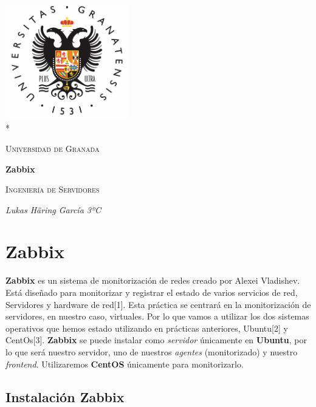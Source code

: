 \documentclass[12pt,a4paper]{article}
\date{\specialdate\today}
\begin{document}
	\begin{titlepage}
		\centering
		\includegraphics[width=0.4\textwidth]{logo-ugr.png}\\*
		{\scshape\LARGE Universidad de Granada \par}
		{\large \date{\specialdate\today}\par}
		\vspace{1cm}
		{\LARGE\bfseries Zabbix\par}
		\vspace{1.5cm}
		{\scshape\large Ingeniería de Servidores\par}
		\vspace{2cm}
		{\Large\itshape Lukas Häring García 3ºC\par}
	\end{titlepage}
	
	\tableofcontents
	
	\newpage
	
	\section{Zabbix}
	\textbf{Zabbix} es un sistema de monitorización de redes creado por Alexei Vladishev. Está diseñado para monitorizar y registrar el estado de varios servicios de red, Servidores y hardware de red[1].
	\newline
	\newline
	Esta práctica se centrará en la monitorización de servidores, en nuestro caso, virtuales. Por lo que vamos a utilizar los dos sistemas operativos que hemos estado utilizando en prácticas anteriores, Ubuntu[2] y CentOs[3].
	\newline
	\newline
	\textbf{Zabbix} se puede instalar como \textit{servidor} únicamente en \textbf{Ubuntu}, por lo que será nuestro servidor, uno de nuestros \textit{agentes} (monitorizado) y nuestro \textit{frontend}. Utilizaremos \textbf{CentOS} únicamente para monitorizarlo.
	
	\subsection{Instalación Zabbix}
	
\end{document}
